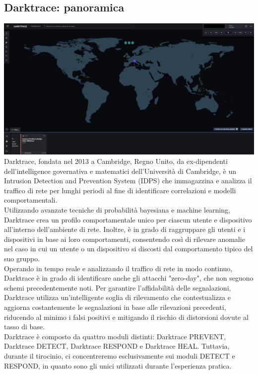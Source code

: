 \subsection{Darktrace: panoramica}
\includegraphics[width=\textwidth]{image/darktrace.png}
Darktrace, fondata nel 2013 a Cambridge, Regno Unito, da ex-dipendenti dell'intelligence governativa e matematici dell'Università di Cambridge, è un Intrusion Detection and Prevention System (IDPS) che immagazzina e analizza il traffico di rete per lunghi periodi al fine di identificare correlazioni e modelli comportamentali.\\
Utilizzando avanzate tecniche di probabilità bayesiana e machine learning, Darktrace crea un profilo comportamentale unico per ciascun utente e dispositivo all'interno dell'ambiente di rete. Inoltre, è in grado di raggruppare gli utenti e i dispositivi in base ai loro comportamenti, consentendo così di rilevare anomalie nel caso in cui un utente o un dispositivo si discosti dal comportamento tipico del suo gruppo.\\
Operando in tempo reale e analizzando il traffico di rete in modo continuo, Darktrace è in grado di identificare anche gli attacchi "zero-day", che non seguono schemi precedentemente noti. Per garantire l'affidabilità delle segnalazioni, Darktrace utilizza un'intelligente soglia di rilevamento che contestualizza e aggiorna costantemente le segnalazioni in base alle rilevazioni precedenti, riducendo al minimo i falsi positivi e mitigando il rischio di distorsioni dovute al tasso di base.\\
Darktrace è composto da quattro moduli distinti: Darktrace PREVENT, Darktrace DETECT, Darktrace RESPOND e Darktrace HEAL. Tuttavia, durante il tirocinio, ci concentreremo esclusivamente sui moduli DETECT e RESPOND, in quanto sono gli unici utilizzati durante l'esperienza pratica\cite{threat1}.


